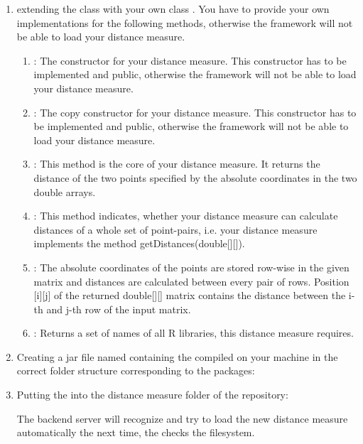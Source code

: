 	\begin{enumerate}
		\item extending the class  with your own class . You have to provide your own implementations for the following methods, otherwise the framework will not be able to load your distance measure.
		\begin{enumerate}
			\item {}: The constructor for your distance measure. This constructor has to be implemented and public, otherwise the framework will not be able to load your distance measure.
			\item {}: The copy constructor for your distance measure. This constructor has to be implemented and public, otherwise the framework will not be able to load your distance measure.
			\item {}: This method is the core of your distance measure. It returns the distance of the two points specified by the absolute coordinates in the two double arrays.
			\item {}: This method indicates, whether your distance measure can calculate distances of a whole set of point-pairs, i.e. your distance measure implements the method getDistances(double[][]).
			\item {}:  The absolute coordinates of the points are stored row-wise in the given matrix and distances are calculated between every pair of rows. Position [i][j] of the returned double[][] matrix contains the distance between the i-th and j-th row of the input matrix.
			\item {}: Returns a set of names of all R libraries, this distance measure requires.
		\end{enumerate}
		
			\item Creating a jar file named  containing the  compiled on your machine in the correct folder structure corresponding to the packages:
			
			
			\item Putting the  into the distance measure folder of the repository:
			
			\highlight{\reposuppdistmeasures}
			
			The backend server will recognize and try to load the new distance measure automatically the next time, the  checks the filesystem.
		\end{enumerate}
		
